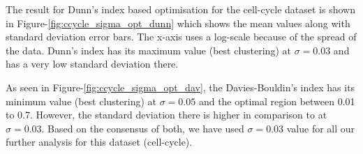 The result for Dunn's index based optimisation for the cell-cycle dataset is shown in Figure-\ref{fig:ccycle_sigma_opt_dunn} which shows the mean values along with standard deviation error bars. 
The x-axis uses a log-scale because of the spread of the data.  Dunn's index has its maximum value (best clustering) at $\sigma=0.03$ and has a very low standard deviation there. 

As seen in Figure-\ref{fig:ccycle_sigma_opt_dav}, the Davies-Bouldin's index has its minimum value (best clustering) at $\sigma=0.05$ and the optimal region between 0.01 to 0.7. However, the standard deviation there is higher in comparison to at $\sigma=0.03$. 
Based on the consensus of both, we have used $\sigma=0.03$ value for all our further analysis for this dataset (cell-cycle). 

